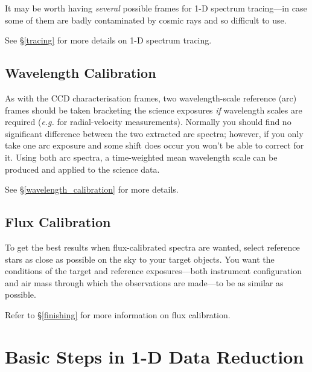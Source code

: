 \documentclass[twoside,11pt]{article}
\newcommand{\stardocinitials}  {SC}
\newcommand{\stardocnumber}    {7.2}
\newcommand{\stardocname}{\stardocinitials /\stardocnumber}
\newcommand{\htmlref}[2]{#1}
\newcommand{\xlabel}[1]{}
\newcommand{\mlabel}[1]{\xlabel{#1}\label{#1}}
\newcommand{\scspec}[2]{#1}
\newcommand{\scspec}[2]{#2}
\begin{document}
It may be worth having {\em several} possible frames for
1-D spectrum tracing\scspec{---}{ - }in case some of them are badly
contaminated by cosmic rays and so difficult to use.

See \scspec{\S\ref{tracing}}{\htmlref{Tracing}{tracing}}
for more details on 1-D spectrum tracing.


\subsection{Wavelength Calibration}

As with the \htmlref{CCD}{gl_ccd} characterisation frames, two
wavelength-scale reference (\htmlref{arc}{gl_arc}) frames should be
taken \htmlref{bracketing}{gl_bracketing} the science exposures
{\em if} \htmlref{wavelength scales}{gl_wavelength} are required
({\it{e.g.}} for radial-velocity measurements)\@.
Normally you should find no significant difference between the two
extracted arc spectra; however, if you only take one arc exposure and
some shift does occur you won't be able to correct for it.
Using both arc spectra, a time-weighted mean wavelength scale can be
produced and applied to the science data.

See \scspec{\S\ref{wavelength_calibration}}
{\htmlref{Wavelength Calibration}{wavelength_calibration}}
for more details.

\subsection{Flux Calibration}

To get the best results when flux-calibrated spectra are wanted, select
reference stars as close as possible on the sky to your target objects.
You want the conditions of the target and reference
exposures\scspec{---}{ - }both instrument configuration and
\htmlref{air mass}{airmass}
through which the observations are made\scspec{---}{ - }to be as
similar as possible.

Refer to \scspec{\S\ref{finishing}}{\htmlref{{\sl{Finishing}}}{finishing}}
for more information on flux calibration.


\section{\mlabel{basic_reduction_steps}Basic Steps in 1-D Data Reduction}
\markboth{Basic 1-D Reduction Steps}{\stardocname}
\end{document}
